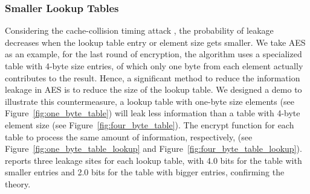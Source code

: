 



\subsubsection{Smaller Lookup Tables}
Considering the cache-collision timing attack \cite{Bonneau11894063_16}, the
probability of leakage decreases when the lookup table entry or element size gets
smaller. We take AES as an example, for the last round of encryption, the algorithm
uses a specialized table with 4-byte size entries, of which only one
byte from each element actually contributes to the result. Hence, a significant method to reduce
the information leakage in AES is to reduce the size of the lookup table. We
designed a demo to illustrate this countermeasure, a lookup table with one-byte
size elements (see Figure~\ref{fig:one_byte_table}) will leak less information
than a table with 4-byte element size (see Figure~\ref{fig:four_byte_table}). 
The encrypt function for each table to process the same amount of information, 
respectively, (see Figure~\ref{fig:one_byte_table_lookup} and
Figure~\ref{fig:four_byte_table_lookup}).  \tool{} reports three leakage sites for
each lookup table, with 4.0 bits for the table with smaller entries and 2.0
bits for the table with bigger entries, confirming the theory.

